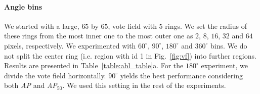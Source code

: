 \documentclass[runningheads]{llncs}
\begin{document}
\paragraph{\textbf{Angle bins}} We started with a large, $65$ by $65$, vote field with 5 rings. We set the radius of these rings from the most inner one to the most outer one as $2$, $8$, $16$, $32$ and $64$ pixels, respectively.  
We experimented with $60^\circ$, $90^\circ$, $180^\circ$ and $360^\circ$ bins. We do not split the center ring (i.e. region with id 1 in Fig.~\ref{fig:vf}) into further regions.  Results are presented in Table~\ref{table:abl_table}a. For the $180^\circ$ experiment, we divide the vote field horizontally. $90^\circ$ yields the best performance considering both  \textit{AP} and  \textit{AP$_{50}$}. We used this setting in the rest of the experiments. 
\end{document}
